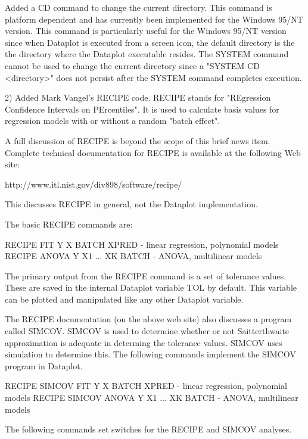 {    Added a CD command to change the current directory.  This command is
    platform dependent and has currently been implemented for the
    Windows 95/NT version.  This command is particularly useful for the
    Windows 95/NT version since when Dataplot is executed from a screen
    icon, the default directory is the the directory where the Dataplot
    executable resides.  The SYSTEM command cannot be used to change the
    current directory since a "SYSTEM CD <directory>" does not persist
    after the SYSTEM command completes execution.

 2) Added Mark Vangel's RECIPE code.  RECIPE stands for "REgression Confidence
    Intervals on PErcentiles".  It is used to calculate basis values for
    regression models with or without a random "batch effect".

    A full discussion of RECIPE is beyond the scope of this brief news item.
    Complete technical documentation for RECIPE is available at the following
    Web site:

       http://www.itl.nist.gov/div898/software/recipe/

    This discusses RECIPE in general, not the Dataplot implementation.

    The basic RECIPE commands are:

      RECIPE FIT Y X BATCH XPRED       - linear regression, polynomial models
      RECIPE ANOVA Y  X1 ... XK  BATCH - ANOVA, multilinear models

    The primary output from the RECIPE command is a set of tolerance values.
    These are saved in the internal Dataplot variable TOL by default.  This
    variable can be plotted and manipulated like any other Dataplot variable.

    The RECIPE documentation (on the above web site) also discusses a program
    called SIMCOV.  SIMCOV is used to determine whether or not Saitterthwaite
    approximation is adequate in determing the tolerance values.  SIMCOV 
    uses simulation to determine this.  The following commands implement
    the SIMCOV program in Dataplot.

      RECIPE SIMCOV FIT Y X BATCH XPRED    - linear regression, polynomial models
      RECIPE SIMCOV ANOVA Y  X1 ... XK  BATCH - ANOVA, multilinear models

    The following commands set switches for the RECIPE and SIMCOV analyses.

}
